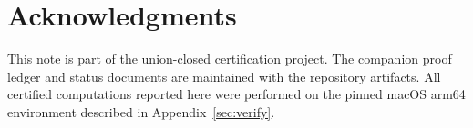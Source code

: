 \documentclass[11pt]{article}
\theoremstyle{plain}
\theoremstyle{definition}
\theoremstyle{remark}
\begin{document}
\section*{Acknowledgments}
This note is part of the union-closed certification project.  The companion
proof ledger and status documents are maintained with the repository
artifacts.  All certified computations reported here were performed on the
pinned macOS arm64 environment described in Appendix~\ref{sec:verify}.



\end{document}
